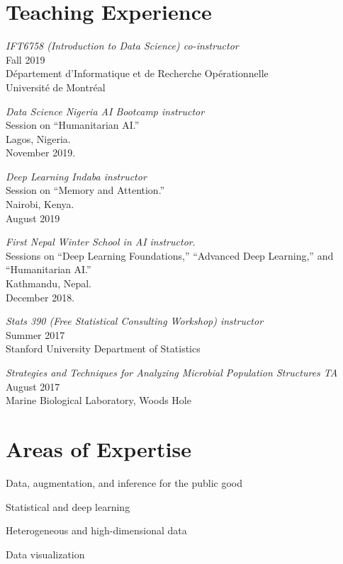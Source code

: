 \documentclass[letterpaper]{article}
\renewenvironment{itemize}{
  \begin{list}{}{
    \setlength{\leftmargin}{1.5em}
  }
}{
  \end{list}
}
\begin{document}
\section*{Teaching Experience}
\begin{itemize}
\item \textit{IFT6758 (Introduction to Data Science) co-instructor} \\
Fall 2019 \\
D\'epartement d'Informatique et de Recherche Op\'erationnelle \\
Universit\'e de Montr\'eal
\item \textit{Data Science Nigeria AI Bootcamp instructor} \\
Session on ``Humanitarian AI.'' \\
Lagos, Nigeria. \\
November 2019.
\item \textit{Deep Learning Indaba instructor} \\
Session on ``Memory and Attention.'' \\
Nairobi, Kenya. \\
August 2019
\item \textit{First Nepal Winter School in AI instructor}. \\
Sessions on ``Deep Learning Foundations,'' ``Advanced Deep Learning,'' and ``Humanitarian AI.'' \\
Kathmandu, Nepal. \\
December 2018.
\item \textit{Stats 390 (Free Statistical Consulting Workshop) instructor} \\
  Summer 2017 \\
  Stanford University Department of Statistics
\item \textit{Strategies and Techniques for Analyzing Microbial Population Structures TA} \\
  August 2017 \\
  Marine Biological Laboratory, Woods Hole
\end{itemize}

\section*{Areas of Expertise}
\begin{itemize}
  \item Data, augmentation, and inference for the public good
  \item Statistical and deep learning
  \item Heterogeneous and high-dimensional data
  \item Data visualization
\end{itemize}
\end{document}
